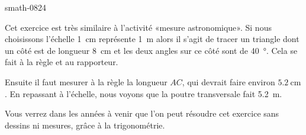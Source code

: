 
\begin{corrige}{smath-0824}

    Cet exercice est très similaire à l'activité «mesure astronomique». Si nous choisissons l'échelle \SI{1}{\centi\meter} représente \SI{1}{\meter} alors il s'agit de tracer un triangle dont un côté est de longueur \SI{8}{\centi\meter} et les deux angles sur ce côté sont de \SI{40}{\degree}. Cela se fait à la règle et au rapporteur.

\begin{center}
   
\end{center}

Ensuite il faut mesurer à la règle la longueur \( AC\), qui devrait faire environ \( \SI{5.2}{\centi\meter}\). En repassant à l'échelle, nous voyons que la poutre transversale fait \SI{5.2}{\meter}.

Vous verrez dans les années à venir que l'on peut résoudre cet exercice sans dessins ni mesures, grâce à la trigonométrie.

\end{corrige}
